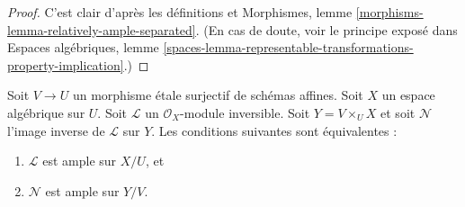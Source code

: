\begin{proof}
C'est clair d'après les définitions et
Morphismes, lemme \ref{morphisms-lemma-relatively-ample-separated}.
(En cas de doute, voir le principe exposé dans
Espaces algébriques, lemme
\ref{spaces-lemma-representable-transformations-property-implication}.)
\end{proof}

\begin{lemma}
\label{lemma-descend-relatively-ample}
Soit $V \to U$ un morphisme \'etale surjectif de schémas affines.
Soit $X$ un espace algébrique sur $U$.
Soit $\mathcal{L}$ un $\mathcal{O}_X$-module inversible.
Soit $Y = V \times_U X$ et soit $\mathcal{N}$
l'image inverse de $\mathcal{L}$ sur $Y$.
Les conditions suivantes sont équivalentes :
\begin{enumerate}
\item $\mathcal{L}$ est ample sur $X/U$, et
\item $\mathcal{N}$ est ample sur $Y/V$.
\end{enumerate}
\end{lemma}


